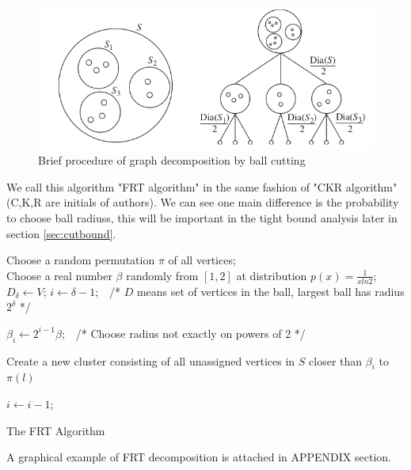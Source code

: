 \documentclass[11pt,twoside, onecolumn]{IEEEtran}
\begin{document}
\begin{figure}[hbt]
	\begin{center}
	\includegraphics[scale=0.4]{laminar.png}
	\end{center}
	\caption{Brief procedure of graph decomposition by ball cutting\cite{thispaper}}
	\label{fig:laminar}
\end{figure}
We call this algorithm "FRT algorithm" in the same fashion of "CKR algorithm"(C,K,R are initials of authors).
We can see one main difference is the probability to choose ball radiuss, this will be important
in the tight bound analysis later in section \ref{sec:cutbound}.

\begin{algorithm}[hbt]
\SetAlgoNoLine
  Choose a random permutation $\pi$ of all vertices;\\
  Choose a real number $\beta$ randomly from $[1,2]$ at distribution $p(x) = \frac{1}{xln2}$;\\
  $D_\delta \gets V$; $i\gets \delta-1$;\ \  /* $D$ means set of vertices in the ball, largest ball has radius $2^\delta$ */\\
  {
  	$\beta_i \gets 2^{i-1}\beta$;\ \ /* Choose radius not exactly on powers of 2 */\\
	{
		{
			Create a new cluster consisting of all unassigned vertices in $S$ closer than $\beta_i$ to $\pi(l)$
		}

	}
	$i\gets i-1$;
   }
\caption {The FRT Algorithm}\label{alg:FRT}
\end{algorithm}
A graphical example of FRT decomposition is attached in APPENDIX section.
\end{document}
